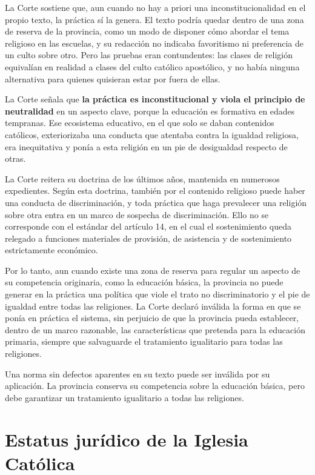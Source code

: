 \documentclass[12pt,oneside]{book}
\begin{document}
La Corte sostiene que, aun cuando no hay a priori una inconstitucionalidad en el propio texto, la práctica sí la genera. El texto podría quedar dentro de una zona de reserva de la provincia, como un modo de disponer cómo abordar el tema religioso en las escuelas, y su redacción no indicaba favoritismo ni preferencia de un culto sobre otro. Pero las pruebas eran contundentes: las clases de religión equivalían en realidad a clases del culto católico apostólico, y no había ninguna alternativa para quienes quisieran estar por fuera de ellas.

La Corte señala que \textbf{la práctica es inconstitucional y viola el principio de neutralidad} en un aspecto clave, porque la educación es formativa en edades tempranas. Ese ecosistema educativo, en el que solo se daban contenidos católicos, exteriorizaba una conducta que atentaba contra la igualdad religiosa, era inequitativa y ponía a esta religión en un pie de desigualdad respecto de otras.

La Corte reitera su doctrina de los últimos años, mantenida en numerosos expedientes. Según esta doctrina, también por el contenido religioso puede haber una conducta de discriminación, y toda práctica que haga prevalecer una religión sobre otra entra en un marco de sospecha de discriminación. Ello no se corresponde con el estándar del artículo 14, en el cual el sostenimiento queda relegado a funciones materiales de provisión, de asistencia y de sostenimiento estrictamente económico.

Por lo tanto, aun cuando existe una zona de reserva para regular un aspecto de su competencia originaria, como la educación básica, la provincia no puede generar en la práctica una política que viole el trato no discriminatorio y el pie de igualdad entre todas las religiones. La Corte declaró inválida la forma en que se ponía en práctica el sistema, sin perjuicio de que la provincia pueda establecer, dentro de un marco razonable, las características que pretenda para la educación primaria, siempre que salvaguarde el tratamiento igualitario para todas las religiones.

\begin{important}
Una norma sin defectos aparentes en su texto puede ser inválida por su aplicación. La provincia conserva su competencia sobre la educación básica, pero debe garantizar un tratamiento igualitario a todas las religiones.
\end{important}

\section{Estatus jurídico de la Iglesia Católica}
\end{document}
